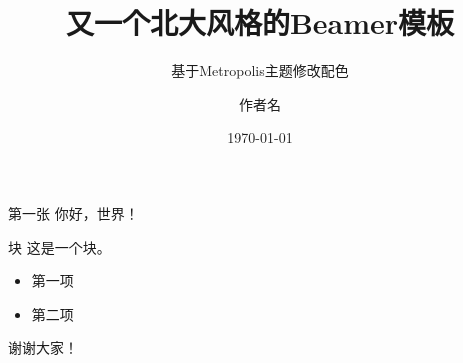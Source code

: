 \documentclass[10pt]{beamer}
\title{又一个北大风格的Beamer模板}
\subtitle{基于Metropolis主题修改配色}
\date{\today}
\author[短作者名]{作者名}
\institute{北京大学XX学院}
\begin{document}
  \maketitle

  \begin{frame}{第一张}
    你好，世界！
    \begin{block}{块}
        这是一个块。
    \end{block}
    
    \begin{itemize}
        \item 第一项
        \item 第二项
    \end{itemize}
  \end{frame}
  
  
  \begin{frame}[standout]
    谢谢大家！
  \end{frame}
\end{document}
